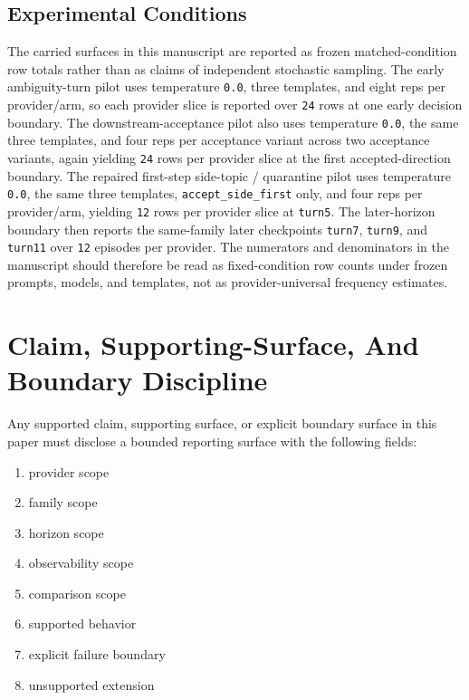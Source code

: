 \documentclass[11pt]{article}
\begin{document}
\subsection{Experimental Conditions}

The carried surfaces in this manuscript are reported as frozen matched-condition
row totals rather than as claims of independent stochastic sampling. The early
ambiguity-turn pilot uses temperature \texttt{0.0}, three templates, and eight
reps per provider/arm, so each provider slice is reported over \texttt{24}
rows at one early decision boundary. The downstream-acceptance pilot also uses
temperature \texttt{0.0}, the same three templates, and four reps per
acceptance variant across two acceptance variants, again yielding \texttt{24}
rows per provider slice at the first accepted-direction boundary. The repaired
first-step side-topic / quarantine pilot uses temperature \texttt{0.0}, the
same three templates, \texttt{accept\_side\_first} only, and four reps per
provider/arm, yielding \texttt{12} rows per provider slice at \texttt{turn5}.
The later-horizon boundary then reports the same-family later checkpoints
\texttt{turn7}, \texttt{turn9}, and \texttt{turn11} over \texttt{12} episodes
per provider. The numerators and denominators in the manuscript should
therefore be read as fixed-condition row counts under frozen prompts, models,
and templates, not as provider-universal frequency estimates.

\section{Claim, Supporting-Surface, And Boundary Discipline}

Any supported claim, supporting surface, or explicit boundary surface in this
paper must disclose a bounded reporting surface with the following fields:

\begin{enumerate}
\item provider scope
\item family scope
\item horizon scope
\item observability scope
\item comparison scope
\item supported behavior
\item explicit failure boundary
\item unsupported extension
\end{enumerate}
\end{document}
